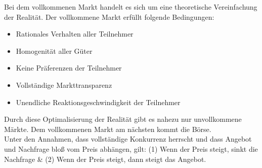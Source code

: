 Bei dem vollkommenen Markt handelt es sich um eine theoretische Vereinfachung der Realität. Der vollkommene Markt erfüllt folgende Bedingungen:

\begin{itemize}
	\item Rationales Verhalten aller Teilnehmer
	\item Homogenität aller Güter
	\item Keine Präferenzen der Teilnehmer
	\item Vollständige Markttransparenz
	\item Unendliche Reaktionsgeschwindigkeit der Teilnehmer
\end{itemize}

Durch diese Optimalisierung der Realität gibt es nahezu nur unvollkommene Märkte. Dem vollkommenen Markt am nächsten kommt die Börse. \\

Unter den Annahmen, dass vollständige Konkurrenz herrscht und dass Angebot und Nachfrage bloß vom Preis abhängen, gilt: (1) Wenn der Preis steigt, sinkt die Nachfrage \& (2) Wenn der Preis steigt, dann steigt das Angebot.\\

